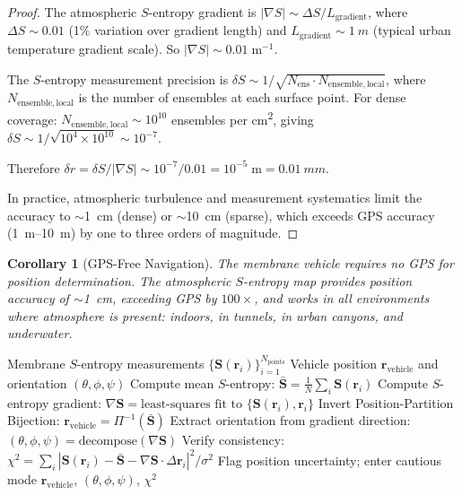 \documentclass[twocolumn,10pt]{article}
\newtheorem{corollary}[theorem]{Corollary}
\theoremstyle{definition}
\theoremstyle{remark}
\newcommand{\Nens}{N_{\mathrm{ens}}}
\begin{document}
\begin{proof}
The atmospheric $S$-entropy gradient is $|\nabla S| \sim \Delta S / L_{\mathrm{gradient}}$, where $\Delta S \sim 0.01$ (1\% variation over gradient length) and $L_{\mathrm{gradient}} \sim \SI{1}{m}$ (typical urban temperature gradient scale). So $|\nabla S| \sim 0.01\;\mathrm{m}^{-1}$.

The $S$-entropy measurement precision is $\delta S \sim 1/\sqrt{\Nens \cdot N_{\mathrm{ensemble,local}}}$, where $N_{\mathrm{ensemble,local}}$ is the number of ensembles at each surface point. For dense coverage: $N_{\mathrm{ensemble,local}} \sim 10^{10}$ ensembles per \si{cm^2}, giving $\delta S \sim 1/\sqrt{10^4 \times 10^{10}} \sim 10^{-7}$.

Therefore $\delta r = \delta S / |\nabla S| \sim 10^{-7}/0.01 = 10^{-5}\;\mathrm{m} = \SI{0.01}{mm}$.

In practice, atmospheric turbulence and measurement systematics limit the accuracy to $\sim$\SI{1}{cm} (dense) or $\sim$\SI{10}{cm} (sparse), which exceeds GPS accuracy (\SI{1}{m}--\SI{10}{m}) by one to three orders of magnitude.
\end{proof}

\begin{corollary}[GPS-Free Navigation]
\label{cor:gps_free}
The membrane vehicle requires no GPS for position determination. The atmospheric $S$-entropy map provides position accuracy of $\sim$\SI{1}{cm}, exceeding GPS by $100\times$, and works in all environments where atmosphere is present: indoors, in tunnels, in urban canyons, and underwater.
\end{corollary}

\begin{algorithm}[H]
\caption{Membrane Position Determination}
\label{alg:position}
\begin{algorithmic}[1]
\REQUIRE Membrane $S$-entropy measurements $\{\mathbf{S}(\mathbf{r}_i)\}_{i=1}^{N_{\mathrm{points}}}$
\ENSURE Vehicle position $\mathbf{r}_{\mathrm{vehicle}}$ and orientation $(\theta, \phi, \psi)$
\STATE Compute mean $S$-entropy: $\bar{\mathbf{S}} = \frac{1}{N} \sum_i \mathbf{S}(\mathbf{r}_i)$
\STATE Compute $S$-entropy gradient: $\nabla\mathbf{S} = \text{least-squares fit to } \{\mathbf{S}(\mathbf{r}_i), \mathbf{r}_i\}$
\STATE Invert Position-Partition Bijection: $\mathbf{r}_{\mathrm{vehicle}} = \Pi^{-1}(\bar{\mathbf{S}})$
\STATE Extract orientation from gradient direction: $(\theta, \phi, \psi) = \text{decompose}(\nabla\mathbf{S})$
\STATE Verify consistency: $\chi^2 = \sum_i |\mathbf{S}(\mathbf{r}_i) - \bar{\mathbf{S}} - \nabla\mathbf{S} \cdot \Delta\mathbf{r}_i|^2 / \sigma^2$
  \STATE Flag position uncertainty; enter cautious mode
\ENDIF
\RETURN $\mathbf{r}_{\mathrm{vehicle}}$, $(\theta, \phi, \psi)$, $\chi^2$
\end{algorithmic}
\end{algorithm}
\end{document}
